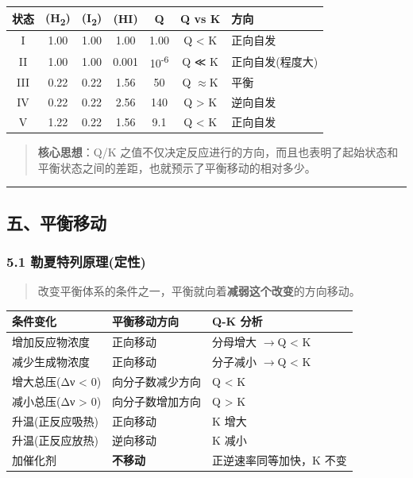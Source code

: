 \documentclass[a4paper,11pt]{ctexart}
\newcounter{none}
\newcommand{\箭}{\ensuremath{\rightarrow}}
\newcommand{\左箭}{\ensuremath{\leftarrow}}
\newcommand{\上箭}{\ensuremath{\uparrow}}
\newcommand{\下箭}{\ensuremath{\downarrow}}
\newcommand{\衡}{\ensuremath{\rightleftharpoons}}
\newcommand{\双箭}{\ensuremath{\leftrightarrow}}
\newcommand{\约等于}{\ensuremath{\approx}}
\newcommand{\小于等于}{\ensuremath{\leq}}
\newcommand{\大于等于}{\ensuremath{\geq}}
\newcommand{\不等于}{\ensuremath{\neq}}
\newcommand{\西格马}{\ensuremath{\sigma}}
\newcommand{\派}{\ensuremath{\pi}}
\begin{document}
{\def\LTcaptype{none} %
\begin{longtable}[]{@{}ccccccl@{}}
\toprule\noalign{}
状态 & (H\textsubscript{2}) & (I\textsubscript{2}) & (HI) & Q & Q vs K & 方向 \\
\midrule\noalign{}
\endhead
\bottomrule\noalign{}
\endlastfoot
I & 1.00 & 1.00 & 1.00 & 1.00 & Q \textless{} K & 正向自发 \\
II & 1.00 & 1.00 & 0.001 & 10\textsuperscript{-6} & Q ≪ K & 正向自发(程度大) \\
III & 0.22 & 0.22 & 1.56 & 50 & Q \约等于 K & 平衡 \\
IV & 0.22 & 0.22 & 2.56 & 140 & Q \textgreater{} K & 逆向自发 \\
V & 1.22 & 0.22 & 1.56 & 9.1 & Q \textless{} K & 正向自发 \\
\end{longtable}
}

\begin{quote}
\textbf{核心思想}：Q/K 之值不仅决定反应进行的方向，而且也表明了起始状态和平衡状态之间的差距，也就预示了平衡移动的相对多少。
\end{quote}

\begin{center}\rule{0.5\linewidth}{0.5pt}\end{center}

\subsection{五、平衡移动}\label{ux4e94ux5e73ux8861ux79fbux52a8}

\subsubsection{5.1 勒夏特列原理(定性)}\label{ux52d2ux590fux7279ux5217ux539fux7406ux5b9aux6027}

\begin{quote}
改变平衡体系的条件之一，平衡就向着\textbf{减弱这个改变}的方向移动。
\end{quote}

{\def\LTcaptype{none} %
\begin{longtable}[]{@{}lll@{}}
\toprule\noalign{}
条件变化 & 平衡移动方向 & Q-K 分析 \\
\midrule\noalign{}
\endhead
\bottomrule\noalign{}
\endlastfoot
增加反应物浓度 & 正向移动 & 分母增大 \箭 Q \textless{} K \\
减少生成物浓度 & 正向移动 & 分子减小 \箭 Q \textless{} K \\
增大总压(Δν \textless{} 0) & 向分子数减少方向 & Q \textless{} K \\
减小总压(Δν \textgreater{} 0) & 向分子数增加方向 & Q \textgreater{} K \\
升温(正反应吸热) & 正向移动 & K 增大 \\
升温(正反应放热) & 逆向移动 & K 减小 \\
加催化剂 & \textbf{不移动} & 正逆速率同等加快，K 不变 \\
\end{longtable}
}
\end{document}
